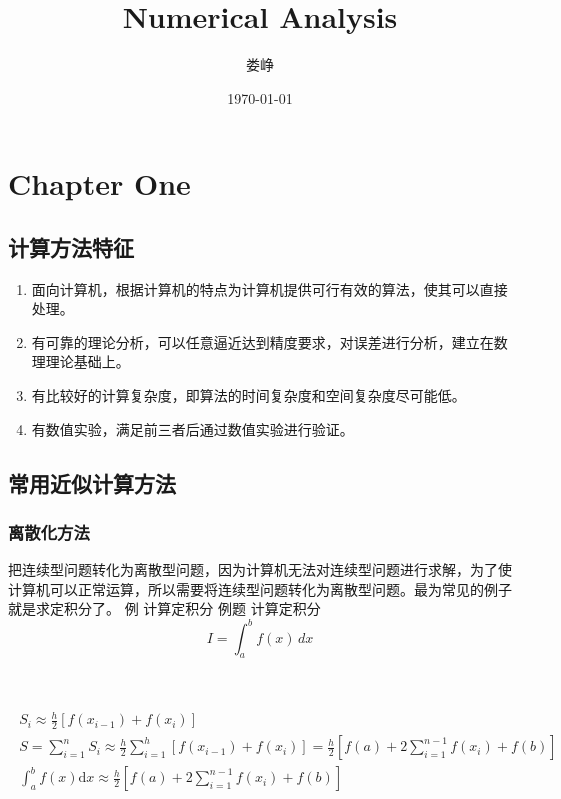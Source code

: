 \documentclass[12pt]{article}
\title{Numerical Analysis}
\author{娄峥}
\date{\today}
\numberwithin{equation}{section}
\begin{document}
	\maketitle
	\tableofcontents
	\clearpage

	\section{Chapter One}
	\subsection{计算方法特征}

	\begin{enumerate}
        \item 面向计算机，根据计算机的特点为计算机提供可行有效的算法，使其可以直接处理。
        \item 有可靠的理论分析，可以任意逼近达到精度要求，对误差进行分析，建立在数理理论基础上。
        \item 有比较好的计算复杂度，即算法的时间复杂度和空间复杂度尽可能低。
        \item 有数值实验，满足前三者后通过数值实验进行验证。
	\end{enumerate}
	
	\subsection{常用近似计算方法}
	\subsubsection{离散化方法}
	把连续型问题转化为离散型问题，因为计算机无法对连续型问题进行求解，为了使计算机可以正常运算，所以需要将连续型问题转化为离散型问题。最为常见的例子就是求定积分了。
例 计算定积分  
	例题 计算定积分
	$$I = \int_{a}^{b} f(x)\, dx$$   

	  \\

	\begin{equation}  
		\begin{aligned}  
			\begin{array}{c}  
				S_{i} \approx \frac{h}{2}\left[f\left(x_{i-1}\right)+f\left(x_{i}\right)\right] \\
				S=\sum_{i=1}^{n} S_{i} \approx \frac{h}{2} \sum_{i=1}^{h}\left[f\left(x_{i-1}\right)+f\left(x_{i}\right)\right]=\frac{h}{2}\left[f(a)+2 \sum_{i=1}^{n-1} f\left(x_{i}\right)+f(b)\right] \\
				\int_{a}^{b} f(x) \mathrm{d} x \approx \frac{h}{2}\left[f(a)+2 \sum_{i=1}^{n-1} f\left(x_{i}\right)+f(b)\right]
			\end{array}  
		\end{aligned}  
	\end{equation}
\end{document}

